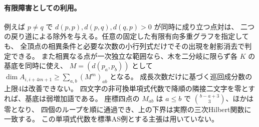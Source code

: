 \paragraph{有限障害としての利用。}
例えば $p\ne q$ で $d(p,p),d(p,q),d(q,p)>0$ が同時に成り立つ点対は、
二つの戻り道による除外を与える。任意の固定した有限有向多重グラフを指定しても、
全頂点の相異条件と必要な次数の小行列式だけでその出現を射影消去で判定できる。
また相異なる点が一次独立な範囲なら、木を二分岐に限らず各 $K$ の基底を同時に使え、
$M=(d(p_a,p_b))$ として $\dim A_{i,i+4m+1}\ge\sum_{a,b}(M^m)_{ab}$ となる。
成長次数だけに基づく巡回成分数の上限4は改善できない。
四文字の非可換単項式代数で降順の隣接二文字を零とすれば、基底は弱増加語である。
座標四点の $M_{ab}$ は $a\le b$ で $\binom{b-a+3}{3}$、ほかは零となり、
四個のループを順に通過でき、上の下界は実際の三次Hilbert関数に一致する。
この単項式代数を標準AS例とする主張は用いていない。
